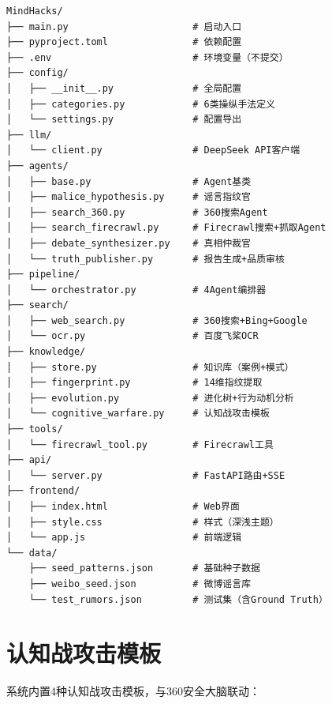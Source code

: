 \documentclass[12pt,a4paper]{ctexart}
\begin{document}
\begin{verbatim}
MindHacks/
├── main.py                      # 启动入口
├── pyproject.toml               # 依赖配置
├── .env                         # 环境变量（不提交）
├── config/
│   ├── __init__.py              # 全局配置
│   ├── categories.py            # 6类操纵手法定义
│   └── settings.py              # 配置导出
├── llm/
│   └── client.py                # DeepSeek API客户端
├── agents/
│   ├── base.py                  # Agent基类
│   ├── malice_hypothesis.py     # 谣言指纹官
│   ├── search_360.py            # 360搜索Agent
│   ├── search_firecrawl.py      # Firecrawl搜索+抓取Agent
│   ├── debate_synthesizer.py    # 真相仲裁官
│   └── truth_publisher.py       # 报告生成+品质审核
├── pipeline/
│   └── orchestrator.py          # 4Agent编排器
├── search/
│   ├── web_search.py            # 360搜索+Bing+Google
│   └── ocr.py                   # 百度飞桨OCR
├── knowledge/
│   ├── store.py                 # 知识库（案例+模式）
│   ├── fingerprint.py           # 14维指纹提取
│   ├── evolution.py             # 进化树+行为动机分析
│   └── cognitive_warfare.py     # 认知战攻击模板
├── tools/
│   └── firecrawl_tool.py        # Firecrawl工具
├── api/
│   └── server.py                # FastAPI路由+SSE
├── frontend/
│   ├── index.html               # Web界面
│   ├── style.css                # 样式（深浅主题）
│   └── app.js                   # 前端逻辑
└── data/
    ├── seed_patterns.json       # 基础种子数据
    ├── weibo_seed.json          # 微博谣言库
    └── test_rumors.json         # 测试集（含Ground Truth）
\end{verbatim}

\section{认知战攻击模板}

系统内置4种认知战攻击模板，与360安全大脑联动：
\end{document}
